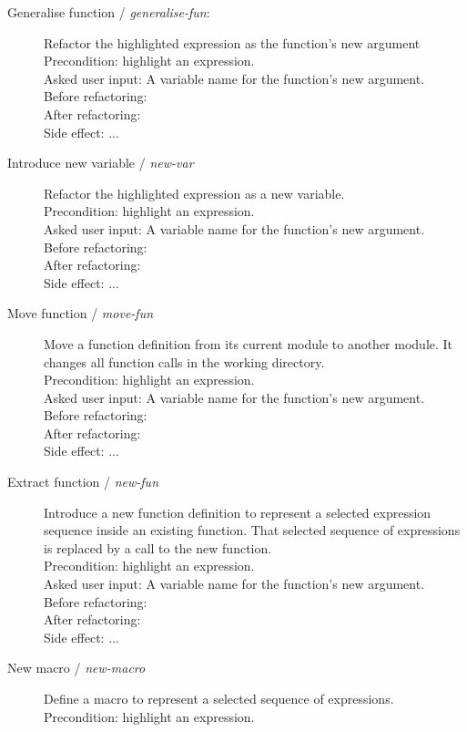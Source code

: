 \begin{description}
	\item[Generalise function / \textit{generalise-fun}:] 
	Refactor the highlighted expression as the function's new argument
	\\Precondition: highlight an expression.
	\\Asked user input: A variable name for the function's new argument. 
	\\Before refactoring:
	\\After refactoring:
	\\Side effect: ...
	\item[Introduce new variable / \textit{new-var}] Refactor the highlighted expression as a new variable.
	\\Precondition: highlight an expression.
	\\Asked user input: A variable name for the function's new argument. 
	\\Before refactoring:
	\\After refactoring:
	\\Side effect: ...
	\item[Move function / \textit{move-fun}] Move a function definition from its current module to another module. It changes all function calls in the working directory.
	\\Precondition: highlight an expression.
	\\Asked user input: A variable name for the function's new argument. 
	\\Before refactoring:
	\\After refactoring:
	\\Side effect: ...
	\item[Extract function / \textit{new-fun}] Introduce a new function definition to represent a selected expression sequence inside an existing function. That selected sequence of expressions is replaced by a call to the new function.
	\\Precondition: highlight an expression.
	\\Asked user input: A variable name for the function's new argument. 
	\\Before refactoring:
	\\After refactoring:
	\\Side effect: ...
	\item[New macro / \textit{new-macro}] Define a macro to represent a selected sequence of expressions.
	\\Precondition: highlight an expression.

\end{description}

